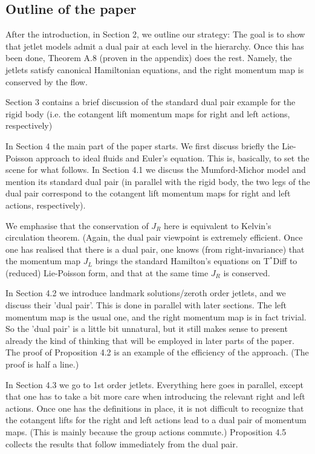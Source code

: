 \documentclass[12pt]{amsart}
\begin{document}
\subsection{Outline of the paper}
After the introduction, in Section 2, we outline our strategy: The goal is to show that jetlet models admit a dual pair at each level in the hierarchy. Once this has been done, Theorem A.8 (proven in the appendix) does the rest. Namely, the jetlets satisfy canonical Hamiltonian equations, and the right momentum map is conserved by the flow.

Section 3 contains a brief discussion of the standard dual pair example for the rigid body (i.e. the cotangent lift momentum maps for right and left actions, respectively)

In Section 4 the main part of the paper starts. We first discuss briefly the Lie-Poisson approach to ideal fluids and Euler's equation. This is, basically, to set the scene for what follows. In Section 4.1 we discuss the Mumford-Michor model and mention its standard dual pair (in parallel with the rigid body, the two legs of the dual pair correspond to the cotangent lift momentum maps for right and left actions, respectively). 

We emphasise that the conservation of $J_R$ here is equivalent to Kelvin's circulation theorem. (Again, the dual pair viewpoint is extremely efficient. Once one has realised that there is a dual pair, one knows (from right-invariance) that the momentum map $J_L$ brings the standard Hamilton's equations on T$^*$Diff to (reduced) Lie-Poisson form, and that at the same time $J_R$  is conserved.

In Section 4.2 we introduce landmark solutions/zeroth order jetlets, and we discuss their 'dual pair'. This is done in parallel with later sections. The left momentum map is the usual one, and the right momentum map is in fact trivial. So the 'dual pair' is a little bit unnatural, but it still makes sense to present already the kind of thinking that will be employed in later parts of the paper. 
%
The proof of Proposition 4.2 is an example of the efficiency of the approach. (The proof is half a line.)

In Section 4.3 we go to 1st order jetlets. Everything here goes in parallel, except that one has to take a bit more care when introducing the relevant right and left actions. Once one has the definitions in place, it is not difficult to recognize that the cotangent lifts for the right and left actions lead to a dual pair of momentum maps. (This is mainly because the group actions commute.) Proposition 4.5 collects the results that follow immediately from the dual pair.
\end{document}
